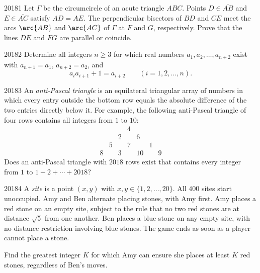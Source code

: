 
\begin{problem}{2018}{1}
Let $\Gamma$ be the circumcircle of an acute triangle $ABC$. Points $D\in\overline{AB}$ and $E\in\overline{AC}$ satisfy $AD=AE$. The perpendicular bisectors of $BD$ and $CE$ meet the arcs $\arc{AB}$ and $\arc{AC}$ of $\Gamma$ at $F$ and $G$, respectively. Prove that the lines $DE$ and $FG$ are parallel or coincide.
\end{problem}

\begin{problem}{2018}{2}
Determine all integers $n\geq3$ for which real numbers $a_1, a_2, \dots, a_{n+2}$ exist with $a_{n+1}=a_1$, $a_{n+2}=a_2$, and
\[
    a_ia_{i+1}+1=a_{i+2}\qquad(i=1, 2, \dots, n).
\]
\end{problem}

\begin{problem}{2018}{3}
An \emph{anti-Pascal triangle} is an equilateral triangular array of numbers in which every entry outside the bottom row equals the absolute difference of the two entries directly below it. For example, the following anti-Pascal triangle of four rows contains all integers from $1$ to $10$:
\[
    \begin{array}{ccccccc}
        &&&4&&&\\
        &&2&&6&&\\
        &5&&7&&1&\\
        8&&3&&10&&9
    \end{array}
\]
Does an anti-Pascal triangle with $2018$ rows exist that contains every integer from $1$ to $1+2+\cdots+2018$?
\end{problem}

\begin{problem}{2018}{4}
A \emph{site} is a point $(x, y)$ with $x, y\in\{1, 2, \dots, 20\}$. All $400$ sites start unoccupied. Amy and Ben alternate placing stones, with Amy first. Amy places a red stone on an empty site, subject to the rule that no two red stones are at distance $\sqrt5$ from one another. Ben places a blue stone on any empty site, with no distance restriction involving blue stones. The game ends as soon as a player cannot place a stone.

Find the greatest integer $K$ for which Amy can ensure she places at least $K$ red stones, regardless of Ben's moves.
\end{problem}

